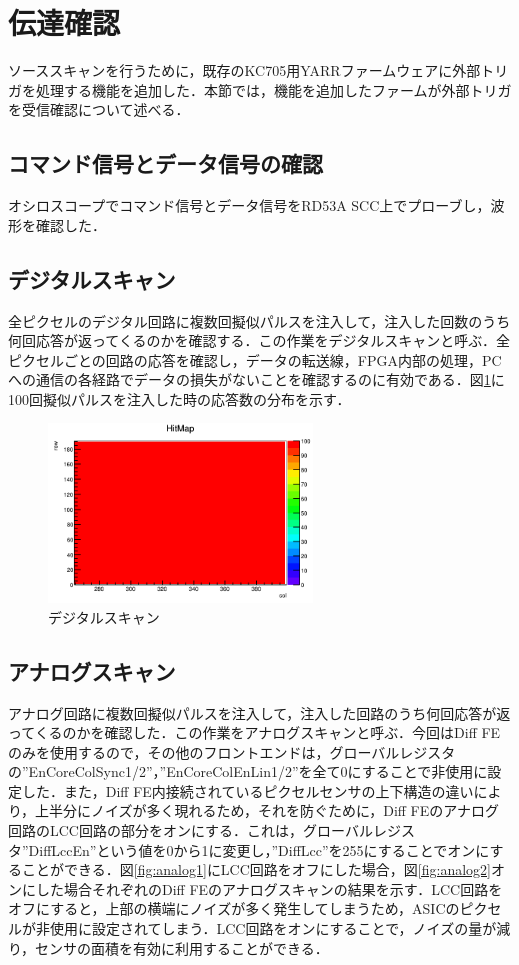 \section{伝達確認}
ソーススキャンを行うために，既存のKC705用YARRファームウェアに外部トリガを処理する機能を追加した．本節では，機能を追加したファームが外部トリガを受信確認について述べる．

\subsection{コマンド信号とデータ信号の確認}
オシロスコープでコマンド信号とデータ信号をRD53A SCC上でプローブし，波形を確認した．

\subsection{デジタルスキャン}
全ピクセルのデジタル回路に複数回擬似パルスを注入して，注入した回数のうち何回応答が返ってくるのかを確認する．この作業をデジタルスキャンと呼ぶ．全ピクセルごとの回路の応答を確認し，データの転送線，FPGA内部の処理，PCへの通信の各経路でデータの損失がないことを確認するのに有効である．図\ref{fig:digital}に100回擬似パルスを注入した時の応答数の分布を示す．
\begin{figure}[h]
  \centering
  \includegraphics[width=7cm]{./figure/DigitalScan.png}
  \caption{デジタルスキャン}
  \label{fig:digital}
\end{figure}


\subsection{アナログスキャン}
アナログ回路に複数回擬似パルスを注入して，注入した回路のうち何回応答が返ってくるのかを確認した．この作業をアナログスキャンと呼ぶ．今回はDiff FEのみを使用するので，その他のフロントエンドは，グローバルレジスタの''EnCoreColSync1/2''，''EnCoreColEnLin1/2''を全て0にすることで非使用に設定した．また，Diff FE内接続されているピクセルセンサの上下構造の違いにより，上半分にノイズが多く現れるため，それを防ぐために，Diff FEのアナログ回路のLCC回路の部分をオンにする．これは，グローバルレジスタ''DiffLccEn''という値を0から1に変更し，''DiffLcc''を255にすることでオンにすることができる．図\ref{fig:analog1}にLCC回路をオフにした場合，図\ref{fig:analog2}オンにした場合それぞれのDiff FEのアナログスキャンの結果を示す．LCC回路をオフにすると，上部の横端にノイズが多く発生してしまうため，ASICのピクセルが非使用に設定されてしまう．LCC回路をオンにすることで，ノイズの量が減り，センサの面積を有効に利用することができる．

